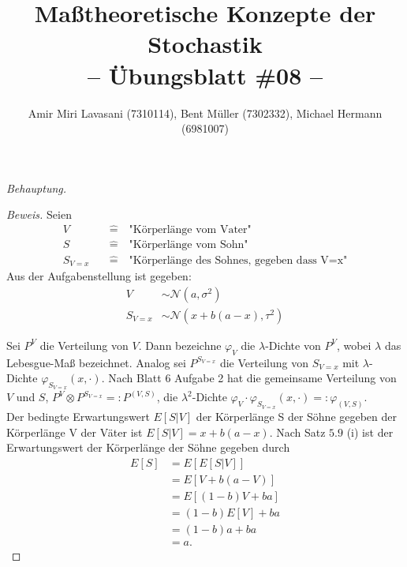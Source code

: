 \documentclass[10pt]{article}
\newcommand{\normal}{\mathcal{N}}
\newcommand{\beh}{\textit{Behauptung. }}
\newenvironment{Aufgabe}[2][Aufgabe]{\begin{trivlist}
\item[\hskip \labelsep {\bfseries #1}\hskip \labelsep {\bfseries #2.}]}{\end{trivlist}}
\begin{document}
 
\title{ \textbf{Maßtheoretische Konzepte der Stochastik \\ -- Übungsblatt \#08 --} }

\author{Amir Miri Lavasani (7310114), Bent Müller (7302332),
        Michael Hermann (6981007)}
\maketitle

\begin{Aufgabe}{1} %
\end{Aufgabe}

\beh

\begin{proof}[Beweis]
	Seien 
	\begin{align*}
		V \quad&\hat{=}\quad \text{"Körperlänge vom Vater"} \\
		S \quad&\hat{=}\quad \text{"Körperlänge vom Sohn"} \\
		S_{V=x} \quad&\hat{=}\quad \text{"Körperlänge des Sohnes, gegeben dass V=x"}
	\end{align*} 
	Aus der Aufgabenstellung ist gegeben:
	\begin{align*}
		V &\sim \normal(a,\sigma^2) \\
		S_{V=x} &\sim \normal(x+b(a-x),\tau^2)
	\end{align*}

	Sei $P^V$ die Verteilung von $V$. Dann bezeichne $\varphi_V$ die $\lambda$-Dichte von $P^V$, wobei 
	$\lambda$ das Lebesgue-Maß bezeichnet. Analog sei $P^{S_{V=x}}$ die Verteilung von $S_{V=x}$ mit 
	$\lambda$-Dichte $\varphi_{S_{V=x}}(x, \cdot)$. Nach Blatt 6 Aufgabe 2 hat die gemeinsame Verteilung von 
	$V$ und $S$, $P^V \otimes P^{S_{V=x}} =: P^{(V,S)}$, die $\lambda^2$-Dichte $\varphi_V \cdot 
	\varphi_{S_{V=x}}(x, \cdot) =: \varphi_{(V,S)}$. \\


	Der bedingte Erwartungswert $E[S|V]$ der Körperlänge S der Söhne gegeben der Körperlänge V der Väter ist 
	$E[S|V] = x+b(a-x)$. Nach Satz $5.9$ (i) ist der Erwartungswert der Körperlänge der Söhne gegeben durch
	\begin{align*}
		E[S] &= E[E[S|V]] 	   \\ 
			&= E[V + b(a-V)]   \\ 
			&= E[(1-b)V + ba]  \\ 
			&= (1-b)E[V] + ba  \\
			&= (1-b)a + ba 	   \\
			&= a.
	\end{align*}   


\end{proof}
\end{document}
